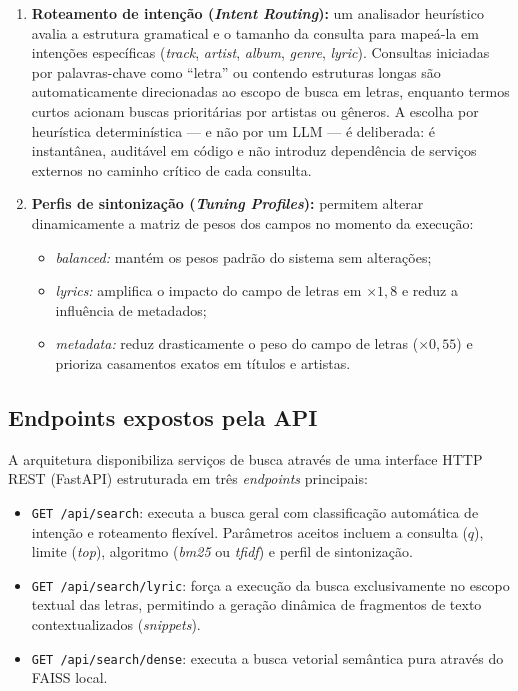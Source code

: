 \documentclass[12pt]{article}
\begin{document}
\begin{enumerate}
  \item \textbf{Roteamento de intenção (\textit{Intent Routing}):} um analisador
    heurístico avalia a estrutura gramatical e o tamanho da consulta para
    mapeá-la em intenções específicas (\textit{track}, \textit{artist},
    \textit{album}, \textit{genre}, \textit{lyric}). Consultas iniciadas por
    palavras-chave como ``letra'' ou contendo estruturas longas são
    automaticamente direcionadas ao escopo de busca em letras, enquanto termos
    curtos acionam buscas prioritárias por artistas ou gêneros. A escolha por
    heurística determinística --- e não por um LLM --- é deliberada: é
    instantânea, auditável em código e não introduz dependência de serviços
    externos no caminho crítico de cada consulta.
  \item \textbf{Perfis de sintonização (\textit{Tuning Profiles}):} permitem
    alterar dinamicamente a matriz de pesos dos campos no momento da execução:
    \begin{itemize}
      \item \textit{balanced:} mantém os pesos padrão do sistema sem alterações;
      \item \textit{lyrics:} amplifica o impacto do campo de letras em
        $\times 1{,}8$ e reduz a influência de metadados;
      \item \textit{metadata:} reduz drasticamente o peso do campo de letras
        ($\times 0{,}55$) e prioriza casamentos exatos em títulos e artistas.
    \end{itemize}
\end{enumerate}

\subsection{Endpoints expostos pela API}

A arquitetura disponibiliza serviços de busca através de uma interface HTTP REST
(FastAPI) estruturada em três \textit{endpoints} principais:

\begin{itemize}
  \item \texttt{GET /api/search}: executa a busca geral com classificação
    automática de intenção e roteamento flexível. Parâmetros aceitos incluem a
    consulta ($q$), limite (\textit{top}), algoritmo (\textit{bm25} ou
    \textit{tfidf}) e perfil de sintonização.
  \item \texttt{GET /api/search/lyric}: força a execução da busca exclusivamente
    no escopo textual das letras, permitindo a geração dinâmica de fragmentos de
    texto contextualizados (\textit{snippets}).
  \item \texttt{GET /api/search/dense}: executa a busca vetorial semântica pura
    através do FAISS local.
\end{itemize}
\end{document}
